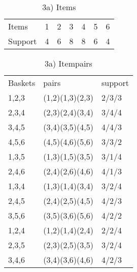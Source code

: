 \documentclass[11pt,a4paper]{scrartcl}
\begin{document}
\begin{itemize}

\begin{table}[h]
\centering
\caption{3a) Items}
\label{my-label}
\begin{tabular}{lllllll}
Items & 1 & 2 & 3 & 4 & 5 & 6 \\
Support & 4 & 6 & 8 & 8 & 6 & 4
\end{tabular}
\end{table}

\begin{table}[h]
\centering
\caption{3a) Itempairs}
\label{my-label}
\begin{tabular}{lll}
Baskets & pairs           & support \\
1,2,3   & (1,2)(1,3)(2,3) & 2/3/3   \\
2,3,4   & (2,3)(2,4)(3,4) & 3/4/4   \\
3,4,5   & (3,4)(3,5)(4,5) & 4/4/3   \\
4,5,6   & (4,5)(4,6)(5,6) & 3/3/2   \\
1,3,5   & (1,3)(1,5)(3,5) & 3/1/4   \\
2,4,6   & (2,4)(2,6)(4,6) & 4/1/3   \\
1,3,4   & (1,3)(1,4)(3,4) & 3/2/4   \\
2,4,5   & (2,4)(2,5)(4,5) & 4/2/3   \\
3,5,6   & (3,5)(3,6)(5,6) & 4/2/2   \\
1,2,4   & (1,2)(1,4)(2,4) & 2/2/4   \\
2,3,5   & (2,3)(2,5)(3,5) & 3/2/4   \\
3,4,6   & (3,4)(3,6)(4,6) & 4/2/3  
\end{tabular}
\end{table}
	

\end{itemize}
\end{document}
